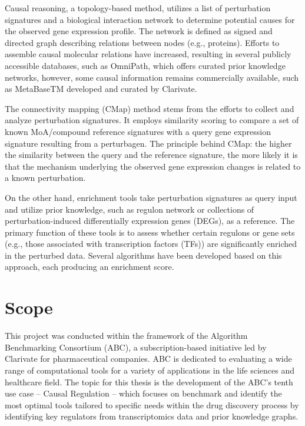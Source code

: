 Causal reasoning, a topology-based method, utilizes a list of perturbation signatures and a biological interaction network to determine potential causes for the observed gene expression profile. The network is defined as signed and directed graph describing relations between nodes (e.g., proteins). Efforts to assemble causal molecular relations have increased, resulting in several publicly accessible databases, such as OmniPath, which offers curated prior knowledge networks, however, some causal information remains commercially available, such as MetaBaseTM developed and curated by Clarivate.

The connectivity mapping (CMap) method stems from the efforts to collect and analyze perturbation signatures. It employs similarity scoring to compare a set of known MoA/compound reference signatures with a query gene expression signature resulting from a perturbagen. The principle behind CMap: the higher the similarity between the query and the reference signature, the more likely it is that the mechanism underlying the observed gene expression changes is related to a known perturbation.

On the other hand, enrichment tools take perturbation signatures as query input and utilize prior knowledge, such as regulon network or collections of perturbation-induced differentially expression genes (DEGs), as a reference. The primary function of these tools is to assess whether certain regulons or gene sets (e.g., those associated with transcription factors (TFs)) are significantly enriched in the perturbed data. Several algorithms have been developed based on this approach, each producing an enrichment score.



\section{Scope} %
\label{sec:scope}
This project was conducted within the framework of the Algorithm Benchmarking Consortium (ABC), a subscription-based initiative led by Clarivate for pharmaceutical companies. ABC is dedicated to evaluating a wide range of computational tools for a variety of applications in the life sciences and healthcare field. The topic for this thesis is the development of the ABC’s tenth use case – Causal Regulation – which focuses on benchmark and identify the most optimal tools tailored to specific needs within the drug discovery process by identifying key regulators from transcriptomics data and prior knowledge graphs.

